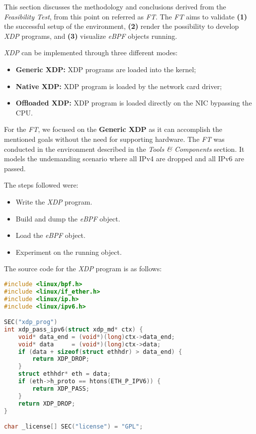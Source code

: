 
This section discusses the methodology and conclusions derived from the \textit{Feasibility Test}, from this point on referred as \textit{FT}.
The \textit{FT} aims to validate \textbf{(1)} the successful setup of the environment, \textbf{(2)} render the possibility to develop \textit{XDP} programs, and \textbf{(3)} visualize \textit{eBPF} objects running.

\textit{XDP} can be implemented through three different modes:
\begin{itemize}
    \item \textbf{Generic XDP:}   XDP programs are loaded into the kernel;
    \item \textbf{Native XDP:}    XDP program is loaded by the network card driver;
    \item \textbf{Offloaded XDP:} XDP program is loaded directly on the NIC bypassing the CPU.
\end{itemize}

For the \textit{FT}, we focused on the \textbf{Generic XDP} as it can accomplish the mentioned goals without the need for supporting hardware.
The \textit{FT} was conducted in the environment described in the \textit{Tools \& Components} section.
It models the undemanding scenario where all IPv4 are dropped and all IPv6 are passed.

The steps followed were:
\begin{itemize}
    \item Write the \textit{XDP} program.
    \item Build and dump the \textit{eBPF} object.
    \item Load the \textit{eBPF} object.
    \item Experiment on the running object.
\end{itemize}
The source code for the \textit{XDP} program is as follows:
\begin{lstlisting}[language=C]
#include <linux/bpf.h>
#include <linux/if_ether.h>
#include <linux/ip.h>
#include <linux/ipv6.h>

SEC("xdp_prog")
int xdp_pass_ipv6(struct xdp_md* ctx) {
    void* data_end = (void*)(long)ctx->data_end;
    void* data     = (void*)(long)ctx->data;
    if (data + sizeof(struct ethhdr) > data_end) { 
        return XDP_DROP;
    }
    struct ethhdr* eth = data;
    if (eth->h_proto == htons(ETH_P_IPV6)) {
        return XDP_PASS;
    }
    return XDP_DROP;
}

char _license[] SEC("license") = "GPL";
\end{lstlisting}

